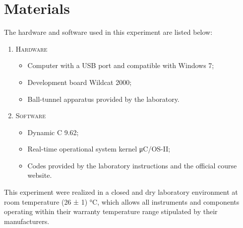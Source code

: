 \section{Materials}

The hardware and software used in this experiment are listed below:

\begin{enumerate}[]
\item \textsc{Hardware}
\begin{itemize}[label={--}]
\item Computer with a USB port and compatible with Windows 7;
\item Development board Wildcat 2000;
\item Ball-tunnel apparatus provided by the laboratory.
\end{itemize}

\item \textsc{Software}
\begin{itemize}[label={--}]
\item Dynamic C 9.62;
\item Real-time operational system kernel μC/OS-II;
\item Codes provided by the laboratory instructions and the official course website.
\end{itemize}
\end{enumerate}

This experiment were realized in a closed and dry laboratory environment at room temperature (26 ± 1) °C, which allows all instruments and components operating within their warranty temperature range stipulated by their manufacturers.
